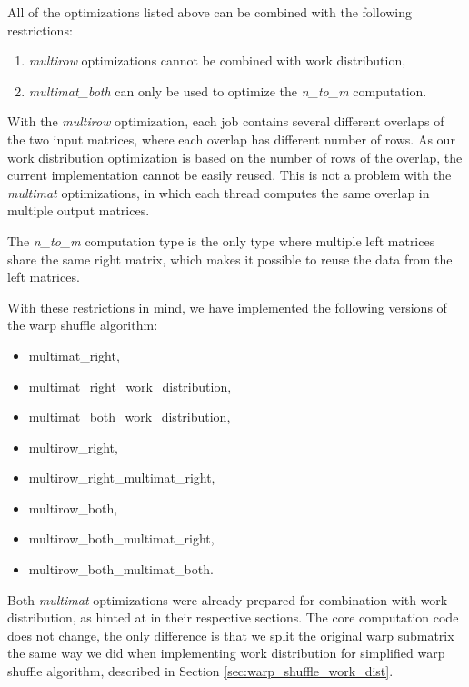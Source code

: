 All of the optimizations listed above can be combined with the following restrictions:
\begin{enumerate}
	\item \textit{multirow} optimizations cannot be combined with work distribution,
	\item \textit{multimat\_both} can only be used to optimize the \textit{n\_to\_m} computation. 
\end{enumerate}

With the \textit{multirow} optimization, each job contains several different overlaps of the two input matrices, where each overlap has different number of rows. As our work distribution optimization is based on the number of rows of the overlap, the current implementation cannot be easily reused. This is not a problem with the \textit{multimat} optimizations, in which each thread computes the same overlap in multiple output matrices.

The \textit{n\_to\_m} computation type is the only type where multiple left matrices share the same right matrix, which makes it possible to reuse the data from the left matrices.


With these restrictions in mind, we have implemented the following versions of the warp shuffle algorithm:

\begin{itemize}
	\item multimat\_right,
	\item multimat\_right\_work\_distribution,
	\item multimat\_both\_work\_distribution,
	\item multirow\_right,
	\item multirow\_right\_multimat\_right,
	\item multirow\_both,
	\item multirow\_both\_multimat\_right,
	\item multirow\_both\_multimat\_both.
\end{itemize}

Both \textit{multimat} optimizations were already prepared for combination with work distribution, as hinted at in their respective sections. The core computation code does not change, the only difference is that we split the original warp submatrix the same way we did when implementing work distribution for simplified warp shuffle algorithm, described in Section \ref{sec:warp_shuffle_work_dist}.

